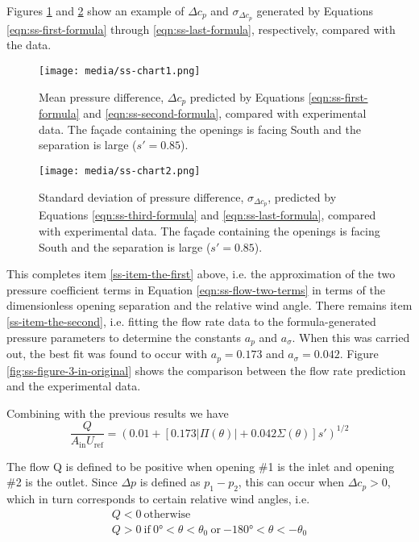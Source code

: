 Figures \ref{fig:ss-figure-2-upper} and \ref{fig:ss-figure-2-lower} show an example of $\Delta c_p$ and $\sigma_{\Delta c_p}$ generated by Equations \ref{eqn:ss-first-formula} through \ref{eqn:ss-last-formula}, respectively, compared with the data.
%
\begin{figure}[hbtp] %
\centering
\texttt{[image: media/ss-chart1.png]}
\caption{Mean pressure difference, $\Delta c_p$ predicted by Equations \ref{eqn:ss-first-formula} and \ref{eqn:ss-second-formula}, compared with experimental data. The fa\c{c}ade containing the openings is facing South and the separation is large ($s' = 0.85$). \protect \label{fig:ss-figure-2-upper}}
\end{figure}
%
\begin{figure}[hbtp] %
\centering
\texttt{[image: media/ss-chart2.png]}
\caption{Standard deviation of pressure difference, $\sigma_{\Delta c_p}$, predicted by Equations \ref{eqn:ss-third-formula} and \ref{eqn:ss-last-formula}, compared with experimental data. The fa\c{c}ade containing the openings is facing South and the separation is large ($s' = 0.85$). \protect \label{fig:ss-figure-2-lower}}
\end{figure}

This completes item \ref{ss-item-the-first} above, i.e. the approximation of the two pressure coefficient terms in Equation \ref{eqn:ss-flow-two-terms} in terms of the dimensionless opening separation and the relative wind angle. There remains item \ref{ss-item-the-second}, i.e. fitting the flow rate data to the formula-generated pressure parameters to determine the constants $a_p$ and $a_\sigma$. When this was carried out, the best fit was found to occur with $a_p = 0.173$ and $a_\sigma = 0.042$. Figure \ref{fig:ss-figure-3-in-original} shows the comparison between the flow rate prediction and the experimental data.

Combining with the previous results we have
\begin{equation}\label{eqn:ss-combined-eqn}
\frac{Q}{A_\text{in} U_\text{ref}}=\left(0.01+\left[0.173 |\Pi(\theta)|+0.042 \Sigma(\theta)\right]s'\right)^{1/2}
\end{equation}

The flow Q is defined to be positive when opening \#1 is the inlet and opening \#2 is the outlet. Since $\Delta p$ is defined as $p_1-p_2$, this can occur when $\Delta c_p > 0$, which in turn corresponds to certain relative wind angles, i.e.
\begin{equation}
\begin{gathered}
Q < 0\ \text{otherwise}\\ 			
Q > 0\ \text{if}\ \ang{0} < \theta < \theta_0\ \text{or}\  \ang{-180} < \theta < -\theta_0
\end{gathered}
\end{equation}

